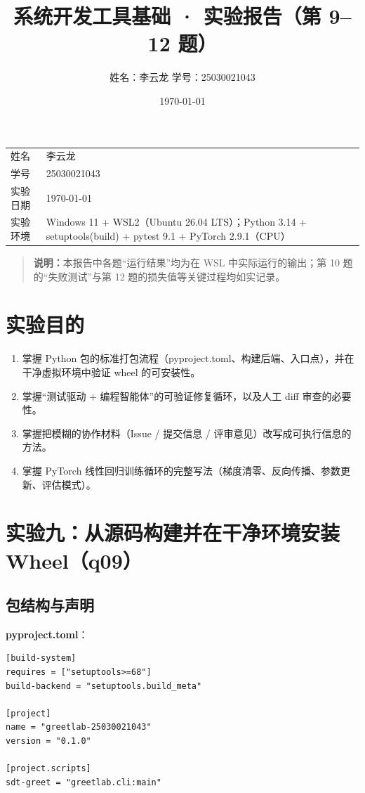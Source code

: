 \documentclass[UTF8,fontset=ubuntu]{ctexart}
\title{\textbf{系统开发工具基础 · 实验报告（第 9--12 题）}}
\author{姓名：李云龙 \quad 学号：25030021043}
\date{\today}
\begin{document}
\maketitle

\begin{center}
\begin{tabular}{@{}p{3cm}p{11.5cm}@{}}
\toprule
姓名 & 李云龙 \\
学号 & 25030021043 \\
实验日期 & \today \\
实验环境 & Windows 11 + WSL2（Ubuntu 26.04 LTS）；Python 3.14 + setuptools(build) + pytest 9.1 + PyTorch 2.9.1（CPU） \\
\bottomrule
\end{tabular}
\end{center}

\begin{quote}
\textbf{说明：}本报告中各题“运行结果”均为在 WSL 中实际运行的输出；第 10 题的“失败测试”与第 12 题的损失值等关键过程均如实记录。
\end{quote}

\section{实验目的}
\begin{enumerate}
\item 掌握 Python 包的标准打包流程（pyproject.toml、构建后端、入口点），并在干净虚拟环境中验证 wheel 的可安装性。
\item 掌握“测试驱动 + 编程智能体”的可验证修复循环，以及人工 diff 审查的必要性。
\item 掌握把模糊的协作材料（Issue / 提交信息 / 评审意见）改写成可执行信息的方法。
\item 掌握 PyTorch 线性回归训练循环的完整写法（梯度清零、反向传播、参数更新、评估模式）。
\end{enumerate}

\section{实验九：从源码构建并在干净环境安装 Wheel（q09）}

\subsection{包结构与声明}
\textbf{pyproject.toml}：
\begin{lstlisting}
[build-system]
requires = ["setuptools>=68"]
build-backend = "setuptools.build_meta"

[project]
name = "greetlab-25030021043"
version = "0.1.0"

[project.scripts]
sdt-greet = "greetlab.cli:main"
\end{lstlisting}
\end{document}
